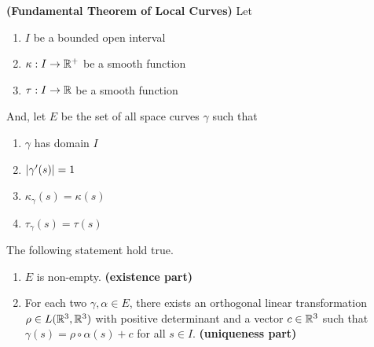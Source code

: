 \documentclass{report}
\begin{document}
\begin{theorem}
\textbf{(Fundamental Theorem of Local Curves)} Let 
\begin{enumerate}[label=(\alph*)]
  \item $I$ be a bounded open interval 
  \item $\kappa:I\rightarrow \mathbb{R}^+$ be a smooth function
  \item  $\tau:I\rightarrow \mathbb{R}$ be a smooth function
\end{enumerate}
And, let $E$  be the set of all space curves $\gamma $ such that  
\begin{enumerate}[label=(\alph*)]
  \item $\gamma $ has domain $I$
  \item $\left|\gamma '(s)\right|=1$
   \item $\kappa_\gamma (s)=\kappa(s)$ 
    \item $\tau_{\gamma }(s)=\tau (s)$
\end{enumerate}
The following statement hold true. 
\begin{enumerate}[label=(\alph*)]
  \item $E$ is non-empty. \textbf{(existence part)}
  \item For each two $\gamma ,\alpha \in E$, there exists an orthogonal linear transformation $\rho \in L(\mathbb{R}^3,\mathbb{R}^3)$ with positive determinant and a vector $c\in\mathbb{R}^3$ such that  $\gamma (s)=\rho \circ \alpha (s)+c$ for all $s \in I$. \textbf{(uniqueness part)}
\end{enumerate}
\end{theorem}
\end{document}

